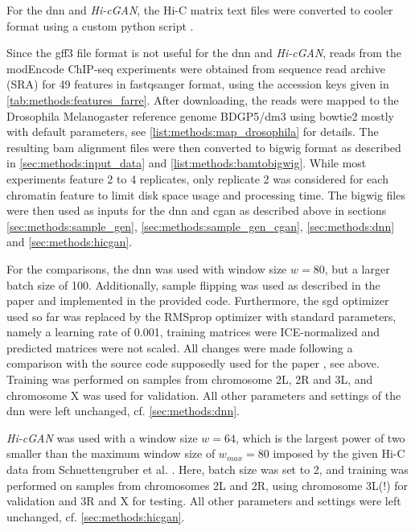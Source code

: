 For the \acrshort{dnn} and \emph{Hi-cGAN}, the Hi-C matrix text files were converted to cooler format 
using a custom python script \cite[scripts/schuettengruberToCooler.py]{Krauth2021b}.

Since the gff3 file format is not useful for the \acrshort{dnn} and \emph{Hi-cGAN}, reads from the modEncode ChIP-seq experiments \cite{Roy2010} 
were obtained from sequence read archive (SRA) for 49 features in fastqsanger format, using the accession keys given in \cref{tab:methods:features_farre}.
After downloading, the reads were mapped to the Drosophila Melanogaster reference genome BDGP5/dm3 using bowtie2 \cite{Langmead2012} 
mostly with default parameters, see \cref{list:methods:map_drosophila} for details.
The resulting bam alignment files were then converted to bigwig format as described in \cref{sec:methods:input_data} and \cref{list:methods:bamtobigwig}.
While most experiments feature 2 to 4 replicates, only replicate 2 was considered for each chromatin feature to limit disk space usage and processing time.
The bigwig files were then used as inputs for the \acrshort{dnn} and \acrshort{cgan} as described above in sections \ref{sec:methods:sample_gen}, \ref{sec:methods:sample_gen_cgan}, \ref{sec:methods:dnn}
and \ref{sec:methods:hicgan}. 

For the comparisons, the \acrshort{dnn} was used with window size $w=80$,
but a larger batch size of 100.
Additionally, sample flipping was used as described in the paper \cite{Farre2018a} and implemented in the provided code.
Furthermore, the \acrshort{sgd} optimizer used so far was replaced by the RMSprop optimizer with standard parameters, namely a learning rate of 0.001,
training matrices were ICE-normalized and predicted matrices were not scaled.
All changes were made following a comparison with the source code supposedly used for the paper \cite{Farre2018a}, see above.
Training was performed on samples from chromosome 2L, 2R and 3L, and chromosome X was used for validation.
All other parameters and settings of the \acrshort{dnn} were left unchanged, cf. \cref{sec:methods:dnn}.

\emph{Hi-cGAN} was used with a window size $w=64$, which is the largest power of two 
smaller than the maximum window size of $w_\mathit{max}=80$ imposed by the given Hi-C data from Schuettengruber et al. \cite{Schuettengruber2014}.
Here, batch size was set to 2, and training was performed on samples from chromosomes 2L and 2R, 
using chromosome 3L(!) for validation and 3R and X for testing. 
All other parameters and settings were left unchanged, cf. \cref{sec:methods:hicgan}.

